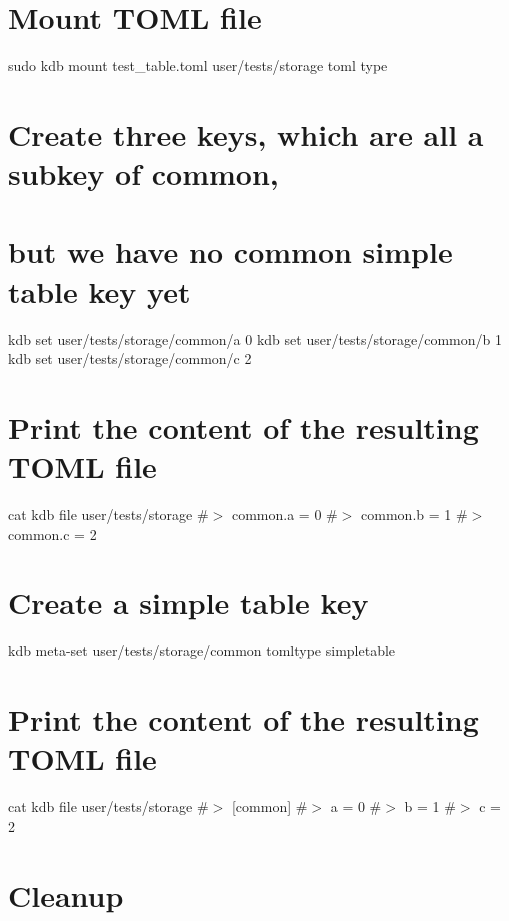  \hypertarget{autotoc_md693_autotoc_md757}{}\section{Mount T\+O\+M\+L file}\label{autotoc_md693_autotoc_md757}
sudo kdb mount test\+\_\+table.\+toml user/tests/storage toml type\hypertarget{autotoc_md693_autotoc_md758}{}\section{Create three keys, which are all a subkey of \textquotesingle{}common\textquotesingle{},}\label{autotoc_md693_autotoc_md758}
\hypertarget{autotoc_md693_autotoc_md759}{}\section{but we have no \textquotesingle{}common\textquotesingle{} simple table key yet}\label{autotoc_md693_autotoc_md759}
kdb set \textquotesingle{}user/tests/storage/common/a\textquotesingle{} \textquotesingle{}0\textquotesingle{} kdb set \textquotesingle{}user/tests/storage/common/b\textquotesingle{} \textquotesingle{}1\textquotesingle{} kdb set \textquotesingle{}user/tests/storage/common/c\textquotesingle{} \textquotesingle{}2\textquotesingle{}\hypertarget{autotoc_md693_autotoc_md760}{}\section{Print the content of the resulting T\+O\+M\+L file}\label{autotoc_md693_autotoc_md760}
cat {\ttfamily kdb file user/tests/storage} \#$>$ common.\+a = 0 \#$>$ common.\+b = 1 \#$>$ common.\+c = 2\hypertarget{autotoc_md693_autotoc_md761}{}\section{Create a simple table key}\label{autotoc_md693_autotoc_md761}
kdb meta-\/set \textquotesingle{}user/tests/storage/common\textquotesingle{} \textquotesingle{}tomltype\textquotesingle{} \textquotesingle{}simpletable\textquotesingle{}\hypertarget{autotoc_md693_autotoc_md762}{}\section{Print the content of the resulting T\+O\+M\+L file}\label{autotoc_md693_autotoc_md762}
cat {\ttfamily kdb file user/tests/storage} \#$>$ \mbox{[}common\mbox{]} \#$>$ a = 0 \#$>$ b = 1 \#$>$ c = 2\hypertarget{autotoc_md693_autotoc_md763}{}\section{Cleanup}\label{autotoc_md693_autotoc_md763}
